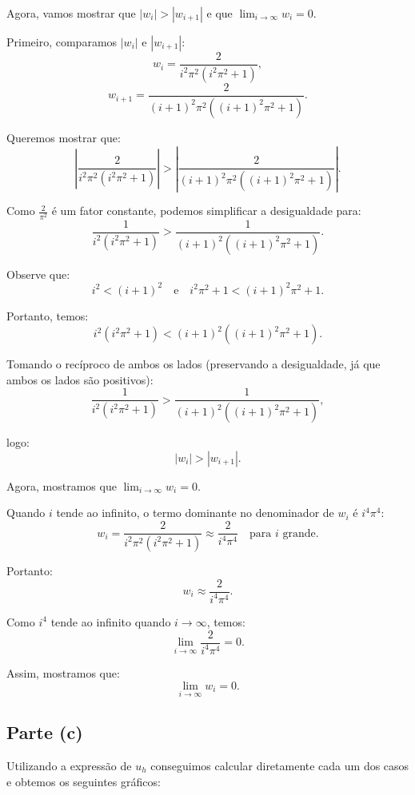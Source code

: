 \documentclass{article}
\begin{document}
Agora, vamos mostrar que \( |w_i| > |w_{i+1}| \) e que \( \lim_{i \to \infty} w_i = 0 \).

Primeiro, comparamos \( |w_i| \) e \( |w_{i+1}| \):
\[
w_i = \frac{2}{i^2 \pi^2 (i^2 \pi^2 + 1)},
\]
\[
w_{i+1} = \frac{2}{(i+1)^2 \pi^2 ((i+1)^2 \pi^2 + 1)}.
\]

Queremos mostrar que:
\[
\left| \frac{2}{i^2 \pi^2 (i^2 \pi^2 + 1)} \right| > \left| \frac{2}{(i+1)^2 \pi^2 ((i+1)^2 \pi^2 + 1)} \right|.
\]

Como \( \frac{2}{\pi^2} \) é um fator constante, podemos simplificar a desigualdade para:
\[
\frac{1}{i^2 (i^2 \pi^2 + 1)} > \frac{1}{(i+1)^2 ((i+1)^2 \pi^2 + 1)}.
\]

Observe que:
\[
i^2 < (i+1)^2 \quad \text{e} \quad i^2 \pi^2 + 1 < (i+1)^2 \pi^2 + 1.
\]

Portanto, temos:
\[
i^2 (i^2 \pi^2 + 1) < (i+1)^2 ((i+1)^2 \pi^2 + 1).
\]

Tomando o recíproco de ambos os lados (preservando a desigualdade, já que ambos os lados são positivos):
\[
\frac{1}{i^2 (i^2 \pi^2 + 1)} > \frac{1}{(i+1)^2 ((i+1)^2 \pi^2 + 1)},
\]

logo:
\[
|w_i| > |w_{i+1}|.
\]

Agora, mostramos que \( \lim_{i \to \infty} w_i = 0 \).

Quando \( i \) tende ao infinito, o termo dominante no denominador de \( w_i \) é \( i^4 \pi^4 \):
\[
w_i = \frac{2}{i^2 \pi^2 (i^2 \pi^2 + 1)} \approx \frac{2}{i^4 \pi^4} \quad \text{para } i \text{ grande}.
\]

Portanto:
\[
w_i \approx \frac{2}{i^4 \pi^4}.
\]

Como \( i^4 \) tende ao infinito quando \( i \to \infty \), temos:
\[
\lim_{i \to \infty} \frac{2}{i^4 \pi^4} = 0.
\]

Assim, mostramos que:
\[
\lim_{i \to \infty} w_i = 0.
\]

\subsection{Parte (c)}

Utilizando a expressão de \( u_h \) conseguimos calcular diretamente cada um dos casos e obtemos os seguintes gráficos:
\end{document}
